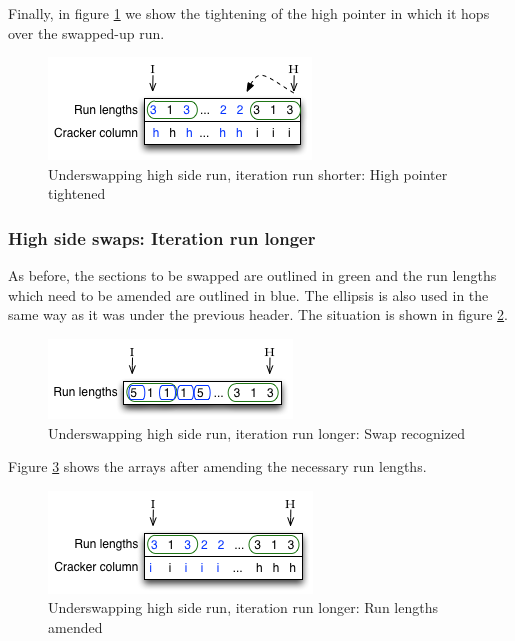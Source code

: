 Finally, in figure \ref{fig:underswapping_1d} we show the tightening of the high pointer in which it hops over the swapped-up run.

\begin{figure}[H]
  \centering
  \includegraphics[]{images/d18_underswapping_1d}
  \caption{Underswapping high side run, iteration run shorter: High pointer tightened}
  \label{fig:underswapping_1d}
\end{figure}

\subsubsection{High side swaps: Iteration run longer}

As before, the sections to be swapped are outlined in green and the run lengths which need to be amended are outlined in blue. The ellipsis is also used in the same way as it was under the previous header. The situation is shown in figure \ref{fig:underswapping_2a}.

\begin{figure}[H]
  \centering
  \includegraphics[]{images/d19_underswapping_2a}
  \caption{Underswapping high side run, iteration run longer: Swap recognized}
  \label{fig:underswapping_2a}
\end{figure}

Figure \ref{fig:underswapping_2b} shows the arrays after amending the necessary run lengths.

\begin{figure}[H]
  \centering
  \includegraphics[]{images/d19_underswapping_2b}
  \caption{Underswapping high side run, iteration run longer: Run lengths amended}
  \label{fig:underswapping_2b}
\end{figure}

